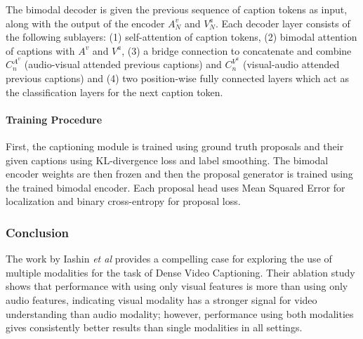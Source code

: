 The bimodal decoder is given the previous sequence of caption tokens as input, along with 
the output of the encoder $A^v_N$ and $V^a_N$. Each decoder layer consists of the following 
sublayers: (1) self-attention of caption tokens, (2) bimodal attention of captions with 
$A^v$ and $V^a$, (3) a bridge connection to concatenate and combine $C_n^{A^v}$ 
(audio-visual attended previous captions) and $C_n^{V^a}$ (visual-audio attended previous 
captions) and (4) two position-wise fully connected layers which act as the classification 
layers for the next caption token.\par


\paragraph{Training Procedure}
\par
First, the captioning module is trained using ground truth proposals and their given 
captions using KL-divergence loss and label smoothing. The bimodal encoder weights are then 
frozen and then the proposal generator is trained using the trained bimodal encoder. Each 
proposal head uses Mean Squared Error for localization and binary cross-entropy for proposal 
loss.\par


\subsubsection{Conclusion}
\par The work by Iashin \textit{et al} provides a compelling case for exploring the use of 
multiple modalities for the task of Dense Video Captioning. Their ablation study shows that 
performance with using only visual features is more than using only audio features, 
indicating visual modality has a stronger signal for video understanding than audio 
modality; however, performance using both modalities gives consistently better results than 
single modalities in all settings.
